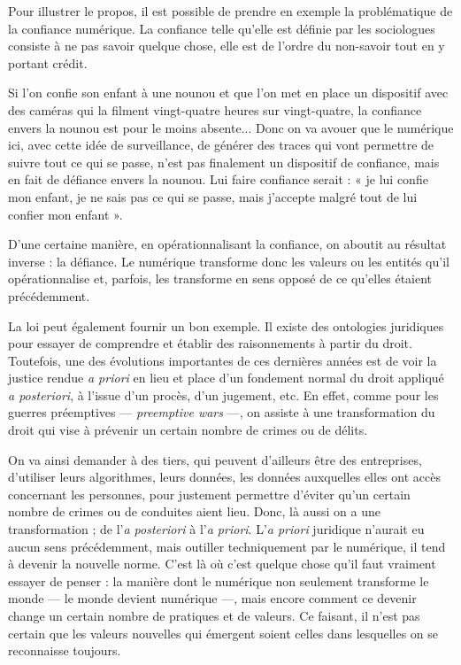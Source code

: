 Pour illustrer le propos, il est possible de prendre en exemple la problématique de la confiance numérique. La confiance telle qu'elle est définie par les sociologues consiste à ne pas savoir quelque chose, elle est de l'ordre du non-­savoir tout en y portant crédit.

Si l'on confie son enfant à une nounou et que l'on met en place un dispositif avec des caméras qui la filment vingt-quatre heures sur vingt-quatre, la confiance envers la nounou est pour le moins absente... Donc on va avouer que le numérique ici, avec cette idée de surveillance, de générer des traces qui vont permettre de suivre tout ce qui se passe, n'est pas finalement un dispositif de confiance, mais en fait de défiance envers la nounou. Lui faire confiance serait : « je lui confie mon enfant, je ne sais pas ce qui se passe, mais j'accepte malgré tout de lui confier mon enfant ». 

D'une certaine manière, en opérationnalisant la confiance, on aboutit au résultat inverse : la défiance. Le numérique transforme donc les valeurs ou les entités qu'il opérationnalise et, parfois, les transforme en sens opposé de ce qu'elles étaient précédemment.

La loi peut également fournir un bon exemple. Il existe des ontologies juridiques pour essayer de comprendre et établir des raisonnements à partir du droit. Toutefois, une des évolutions importantes de ces dernières années est de voir la justice rendue \textit{a priori} en lieu et place d'un fondement normal du droit appliqué \textit{a posteriori}, à l'issue d'un procès, d'un jugement, etc. En effet, comme pour les guerres préemptives --- \textit{preemptive wars} ---, on assiste à une transformation du droit qui vise à prévenir un certain nombre de crimes ou de délits.

On va ainsi demander à des tiers, qui peuvent d'ailleurs être des entreprises, d'utiliser leurs algorithmes, leurs données, les données auxquelles elles ont accès concernant les personnes, pour justement permettre d'éviter qu'un certain nombre de crimes ou de conduites aient lieu. Donc, là aussi on a une transformation ; de l'\textit{a posteriori} à l'\textit{a priori}. L'\textit{a priori} juridique n'aurait eu aucun sens précédemment, mais outiller techniquement par le numérique, il tend à devenir la nouvelle norme. C'est là où c'est quelque chose qu'il faut vraiment essayer de penser : la manière dont le numérique non seulement transforme le monde --- le monde devient numérique ---, mais encore comment ce devenir change un certain nombre de pratiques et de valeurs. Ce faisant, il n'est pas certain que les valeurs nouvelles qui émergent soient celles dans lesquelles on se reconnaisse toujours. 

